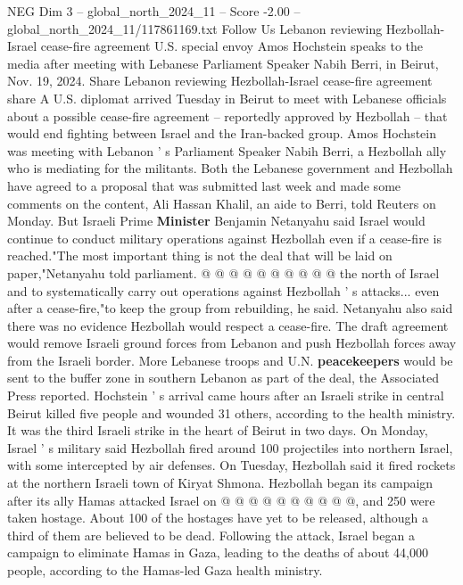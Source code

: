 \begin{textsample}{NEG Dim 3 – global\_north\_2024\_11 – Score -2.00 – global\_north\_2024\_11/117861169.txt}  \label{ex:f3_neg_271}
Follow Us Lebanon reviewing Hezbollah-Israel cease-fire agreement U.S. special envoy Amos Hochstein speaks to the media after meeting with Lebanese Parliament Speaker Nabih Berri, in Beirut, Nov. 19, 2024.
Share Lebanon reviewing Hezbollah-Israel cease-fire agreement share A U.S. diplomat arrived Tuesday in Beirut to meet with Lebanese officials about a possible cease-fire agreement -- reportedly approved by Hezbollah -- that would end fighting between Israel and the Iran-backed group.
Amos Hochstein was meeting with Lebanon ' s Parliament Speaker Nabih Berri, a Hezbollah ally who is mediating for the militants.
Both the Lebanese government and Hezbollah have agreed to a proposal that was submitted last week and made some comments on the content, Ali Hassan Khalil, an aide to Berri, told Reuters on Monday.
But Israeli Prime \textbf{Minister} Benjamin Netanyahu said Israel would continue to conduct military operations against Hezbollah even if a cease-fire is reached."The most important thing is not the deal that will be laid on paper,"Netanyahu told parliament. @ @ @ @ @ @ @ @ @ @ the north of Israel and to systematically carry out operations against Hezbollah ' s attacks... even after a cease-fire,"to keep the group from rebuilding, he said.
Netanyahu also said there was no evidence Hezbollah would respect a cease-fire.
The draft agreement would remove Israeli ground forces from Lebanon and push Hezbollah forces away from the Israeli border.
More Lebanese troops and U.N. \textbf{peacekeepers} would be sent to the buffer zone in southern Lebanon as part of the deal, the Associated Press reported.
Hochstein ' s arrival came hours after an Israeli strike in central Beirut killed five people and wounded 31 others, according to the health ministry.
It was the third Israeli strike in the heart of Beirut in two days.
On Monday, Israel ' s military said Hezbollah fired around 100 projectiles into northern Israel, with some intercepted by air defenses.
On Tuesday, Hezbollah said it fired rockets at the northern Israeli town of Kiryat Shmona.
Hezbollah began its campaign after its ally Hamas attacked Israel on @ @ @ @ @ @ @ @ @ @, and 250 were taken hostage.
About 100 of the hostages have yet to be released, although a third of them are believed to be dead.
Following the attack, Israel began a campaign to eliminate Hamas in Gaza, leading to the deaths of about 44,000 people, according to the Hamas-led Gaza health ministry.

\end{textsample}
